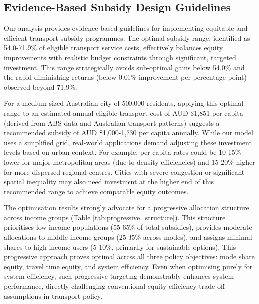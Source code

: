 \documentclass[a4paper,fleqn]{cas-sc}
\begin{document}
\subsection{Evidence-Based Subsidy Design Guidelines}

Our analysis provides evidence-based guidelines for implementing equitable and efficient transport subsidy programmes. The optimal subsidy range, identified as 54.0-71.9\% of eligible transport service costs, effectively balances equity improvements with realistic budget constraints through significant, targeted investment. This range strategically avoids sub-optimal gains below 54.0\% and the rapid diminishing returns (below 0.01\% improvement per percentage point) observed beyond 71.9\%.

For a medium-sized Australian city of 500,000 residents, applying this optimal range to an estimated annual eligible transport cost of AUD \$1,851 per capita (derived from ABS data and Australian transport patterns) suggests a recommended subsidy of AUD \$1,000-1,330 per capita annually. While our model uses a simplified grid, real-world applications demand adjusting these investment levels based on urban context. For example, per-capita rates could be 10-15\% lower for major metropolitan areas (due to density efficiencies) and 15-20\% higher for more dispersed regional centres. Cities with severe congestion or significant spatial inequality may also need investment at the higher end of this recommended range to achieve comparable equity outcomes.

The optimisation results strongly advocate for a progressive allocation structure across income groups (Table \ref{tab:progressive_structure}). This structure prioritises low-income populations (55-65\% of total subsidies), provides moderate allocations to middle-income groups (25-35\% across modes), and assigns minimal shares to high-income users (5-10\%, primarily for sustainable options). This progressive approach proves optimal across all three policy objectives: mode share equity, travel time equity, and system efficiency. Even when optimising purely for system efficiency, such progressive targeting demonstrably enhances system performance, directly challenging conventional equity-efficiency trade-off assumptions in transport policy.
\end{document}
